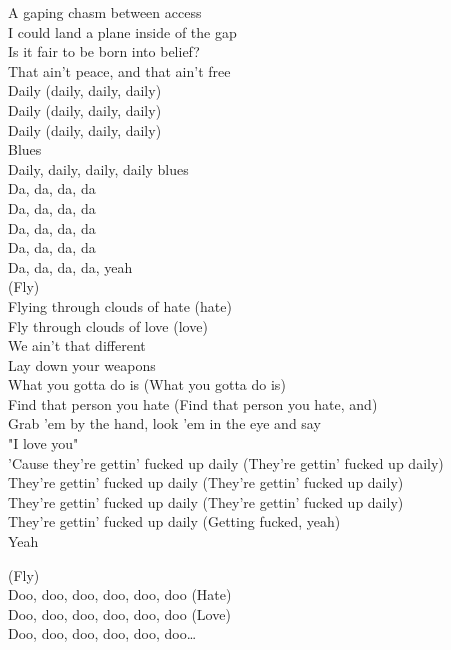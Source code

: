 A gaping chasm between access \\
I could land a plane inside of the gap \\
Is it fair to be born into belief? \\
That ain't peace, and that ain't free \\
Daily (daily, daily, daily) \\
Daily (daily, daily, daily) \\
Daily (daily, daily, daily) \\
Blues \\
Daily, daily, daily, daily blues \\

Da, da, da, da \\
Da, da, da, da \\
Da, da, da, da \\
Da, da, da, da \\
Da, da, da, da, yeah \\

(Fly) \\
Flying through clouds of hate (hate) \\
Fly through clouds of love (love) \\
We ain't that different \\
Lay down your weapons \\
What you gotta do is (What you gotta do is) \\
Find that person you hate (Find that person you hate, and) \\
Grab 'em by the hand, look 'em in the eye and say \\
"I love you" \\

'Cause they're gettin' fucked up daily (They're gettin' fucked up daily) \\
They're gettin' fucked up daily (They're gettin' fucked up daily) \\
They're gettin' fucked up daily (They're gettin' fucked up daily) \\
They're gettin' fucked up daily (Getting fucked, yeah) \\
Yeah

(Fly) \\
Doo, doo, doo, doo, doo, doo (Hate) \\
Doo, doo, doo, doo, doo, doo (Love) \\
Doo, doo, doo, doo, doo, doo… \\

